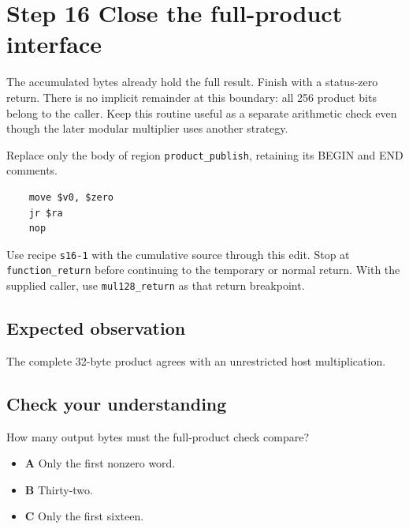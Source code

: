 \section{Step 16 Close the full-product interface}\label{rsa-s16}

The accumulated bytes already hold the full result. Finish with a status-zero return. There is no implicit remainder at this boundary: all 256 product bits belong to the caller. Keep this routine useful as a separate arithmetic check even though the later modular multiplier uses another strategy.

Replace only the body of region \texttt{product\_publish}, retaining its BEGIN and END comments.

\begin{verbatim}
    move $v0, $zero
    jr $ra
    nop
\end{verbatim}

Use recipe \texttt{s16-1} with the cumulative source through this edit. Stop at \texttt{function\_return} before continuing to the temporary or normal return. With the supplied caller, use \texttt{mul128\_return} as that return breakpoint.

\subsection{Expected observation}
The complete 32-byte product agrees with an unrestricted host multiplication.

\subsection{Check your understanding}
How many output bytes must the full-product check compare?

\begin{itemize}
  \item \textbf{A} Only the first nonzero word.
  \item \textbf{B} Thirty-two.
  \item \textbf{C} Only the first sixteen.
\end{itemize}
